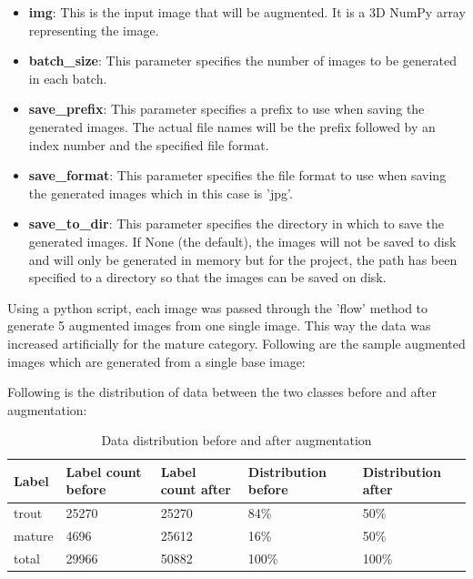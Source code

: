 \begin{itemize}
    \item \textbf{img}: This is the input image that will be augmented. It is a 3D NumPy array representing the image.
    \item \textbf{batch\_size}: This parameter specifies the number of images to be generated in each batch.
    \item \textbf{save\_prefix}: This parameter specifies a prefix to use when saving the generated images. The actual file names will be the prefix followed by an index number and the specified file format.
    \item \textbf{save\_format}: This parameter specifies the file format to use when saving the generated images which in this case is 'jpg'.
    \item \textbf{save\_to\_dir}: This parameter specifies the directory in which to save the generated images. If None (the default), the images will not be saved to disk and will only be generated in memory but for the project, the path has been specified to a directory so that the images can be saved on disk.
\end{itemize}

Using a python script, each image was passed through the 'flow' method to generate 5 augmented images from one single image. This way the data was increased artificially for the mature category. Following are the sample augmented images which are generated from a single base image:


Following is the distribution of data between the two classes before and after augmentation:

\begin{table}[ht!]
\centering
\begin{tabularx}{\textwidth}{@{} *5{X} @{}}
\toprule
\textbf{Label} & \textbf{Label count before} & \textbf{Label count after} & \textbf{Distribution before} & \textbf{Distribution after} \\
\midrule
    trout     & 25270 & 25270  & 84\%  & 50\%  \\[1.3ex]
    mature    &  4696 & 25612  & 16\%  & 50\%  \\[1.3ex]
    total     & 29966 & 50882  & 100\% & 100\% \\[1.3ex]
\bottomrule
\end{tabularx}
\caption{Data distribution before and after augmentation}
\label{table:data_augmentation}
\end{table}



